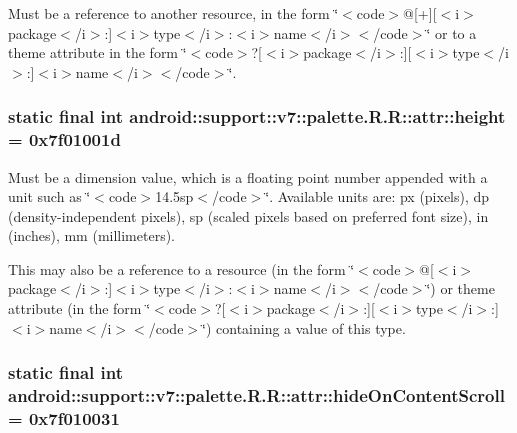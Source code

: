 Must be a reference to another resource, in the form \char`\"{}$<$code$>$@\mbox{[}+\mbox{]}\mbox{[}$<$i$>$package$<$/i$>$:\mbox{]}$<$i$>$type$<$/i$>$:$<$i$>$name$<$/i$>$$<$/code$>$\char`\"{} or to a theme attribute in the form \char`\"{}$<$code$>$?\mbox{[}$<$i$>$package$<$/i$>$:\mbox{]}\mbox{[}$<$i$>$type$<$/i$>$:\mbox{]}$<$i$>$name$<$/i$>$$<$/code$>$\char`\"{}. \hypertarget{classandroid_1_1support_1_1v7_1_1palette_1_1_r_1_1attr_a4ec581fa96d86085d44778399642859}{
\subsubsection[{height}]{\setlength{\rightskip}{0pt plus 5cm}static final int android::support::v7::palette.R.R::attr::height = 0x7f01001d}}
\label{classandroid_1_1support_1_1v7_1_1palette_1_1_r_1_1attr_a4ec581fa96d86085d44778399642859}


Must be a dimension value, which is a floating point number appended with a unit such as \char`\"{}$<$code$>$14.5sp$<$/code$>$\char`\"{}. Available units are: px (pixels), dp (density-independent pixels), sp (scaled pixels based on preferred font size), in (inches), mm (millimeters). 

This may also be a reference to a resource (in the form \char`\"{}$<$code$>$@\mbox{[}$<$i$>$package$<$/i$>$:\mbox{]}$<$i$>$type$<$/i$>$:$<$i$>$name$<$/i$>$$<$/code$>$\char`\"{}) or theme attribute (in the form \char`\"{}$<$code$>$?\mbox{[}$<$i$>$package$<$/i$>$:\mbox{]}\mbox{[}$<$i$>$type$<$/i$>$:\mbox{]}$<$i$>$name$<$/i$>$$<$/code$>$\char`\"{}) containing a value of this type. \hypertarget{classandroid_1_1support_1_1v7_1_1palette_1_1_r_1_1attr_600ad5dc118bafcc3fd2207117b59bb6}{
\subsubsection[{hideOnContentScroll}]{\setlength{\rightskip}{0pt plus 5cm}static final int android::support::v7::palette.R.R::attr::hideOnContentScroll = 0x7f010031}}
\label{classandroid_1_1support_1_1v7_1_1palette_1_1_r_1_1attr_600ad5dc118bafcc3fd2207117b59bb6}


